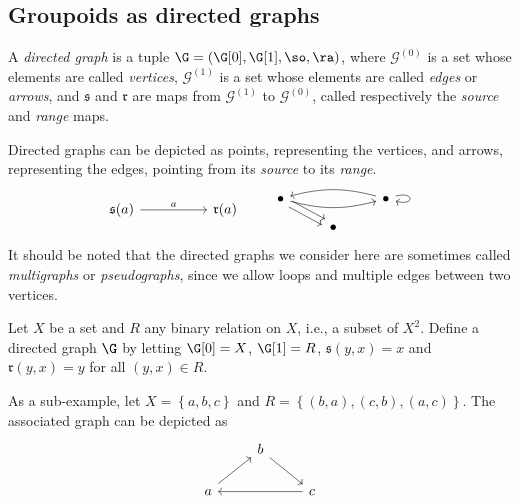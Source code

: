 %


%


\subsection{Groupoids as directed graphs}

\begin{definition}[\cite{MR1724106}]
A \emph{directed graph} is a tuple $\G=(\G[0],\G[1],\so,\ra)$, where $\mathcal{G}^{(0)}$ is a set whose elements are called \emph{vertices}, $\mathcal{G}^{(1)}$ is a set whose elements are called \emph{edges} or \emph{arrows}, and $\mathfrak{s}$ and $\mathfrak{r}$ are maps from $\mathcal{G}^{(1)}$ to $\mathcal{G}^{(0)}$, called respectively the \emph{source} and \emph{range} maps.
\end{definition}

Directed graphs can be depicted as points, representing the vertices, and arrows, representing the edges, pointing from its \emph{source} to its \emph{range}. 
\[\begin{tikzcd}
\mathfrak{s}(a)\arrow[rr,"a"]& &\mathfrak{r}(a)
\end{tikzcd}\qquad
\begin{tikzcd}[row sep=small]
\bullet\arrow[dr,shift left]\arrow[dr,shift right]\arrow[rr, bend right=15]&&\arrow[ll, bend right=15]\bullet\arrow[loop right]\\
&\bullet&\end{tikzcd}\]
It should be noted that the directed graphs we consider here are sometimes called \emph{multigraphs} or \emph{pseudographs}, since we allow loops and multiple edges between two vertices.

\begin{example}\label{examplegraphtriangle}
Let $X$ be a set and $R$ any binary relation on $X$, i.e., a subset of $X^2$. Define a directed graph $\G$ by letting $\G[0]=X$, $\G[1]=R$, $\mathfrak{s}(y,x)=x$ and $\mathfrak{r}(y,x)=y$ for all $(y,x)\in R$.

As a sub-example, let $X=\left\{a,b,c\right\}$ and $R=\left\{(b,a),(c,b),(a,c)\right\}$. The associated graph can be depicted as
\[\begin{tikzcd}
&b\arrow[rd]&\\
a\arrow[ur]&&c\arrow[ll]\end{tikzcd}\]
\end{example}


